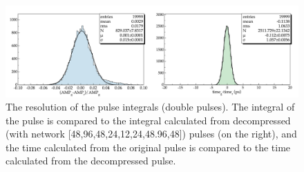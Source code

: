\begin{figure}[h!]
\centering
\includegraphics[width=0.9\columnwidth]{out_evaluate96_12_csv.pdf}
\caption{The resolution of the pulse integrals (double pulses). The integral of the pulse is compared to the integral calculated from decompressed (with network [48,96,48,24,12,24,48.96,48]) pulses (on the right), and the time calculated from the original pulse is compared to the time calculated from the decompressed pulse.} 
\label{fig:results_dp_96_res}
\end{figure}

